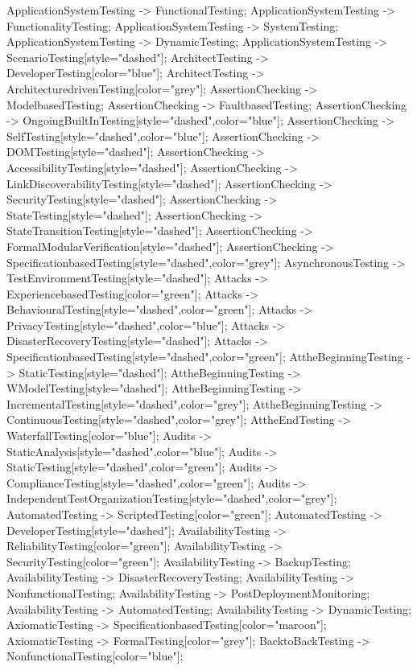 \documentclass{article}
\begin{document}
{ApplicationSystemTesting -> FunctionalTesting;
ApplicationSystemTesting -> FunctionalityTesting;
ApplicationSystemTesting -> SystemTesting;
ApplicationSystemTesting -> DynamicTesting;
ApplicationSystemTesting -> ScenarioTesting[style="dashed"];
ArchitectTesting -> DeveloperTesting[color="blue"];
ArchitectTesting -> ArchitecturedrivenTesting[color="grey"];
AssertionChecking -> ModelbasedTesting;
AssertionChecking -> FaultbasedTesting;
AssertionChecking -> OngoingBuiltInTesting[style="dashed",color="blue"];
AssertionChecking -> SelfTesting[style="dashed",color="blue"];
AssertionChecking -> DOMTesting[style="dashed"];
AssertionChecking -> AccessibilityTesting[style="dashed"];
AssertionChecking -> LinkDiscoverabilityTesting[style="dashed"];
AssertionChecking -> SecurityTesting[style="dashed"];
AssertionChecking -> StateTesting[style="dashed"];
AssertionChecking -> StateTransitionTesting[style="dashed"];
AssertionChecking -> FormalModularVerification[style="dashed"];
AssertionChecking -> SpecificationbasedTesting[style="dashed",color="grey"];
AsynchronousTesting -> TestEnvironmentTesting[style="dashed"];
Attacks -> ExperiencebasedTesting[color="green"];
Attacks -> BehaviouralTesting[style="dashed",color="green"];
Attacks -> PrivacyTesting[style="dashed",color="blue"];
Attacks -> DisasterRecoveryTesting[style="dashed"];
Attacks -> SpecificationbasedTesting[style="dashed",color="green"];
AttheBeginningTesting -> StaticTesting[style="dashed"];
AttheBeginningTesting -> WModelTesting[style="dashed"];
AttheBeginningTesting -> IncrementalTesting[style="dashed",color="grey"];
AttheBeginningTesting -> ContinuousTesting[style="dashed",color="grey"];
AttheEndTesting -> WaterfallTesting[color="blue"];
Audits -> StaticAnalysis[style="dashed",color="blue"];
Audits -> StaticTesting[style="dashed",color="green"];
Audits -> ComplianceTesting[style="dashed",color="green"];
Audits -> IndependentTestOrganizationTesting[style="dashed",color="grey"];
AutomatedTesting -> ScriptedTesting[color="green"];
AutomatedTesting -> DeveloperTesting[style="dashed"];
AvailabilityTesting -> ReliabilityTesting[color="green"];
AvailabilityTesting -> SecurityTesting[color="green"];
AvailabilityTesting -> BackupTesting;
AvailabilityTesting -> DisasterRecoveryTesting;
AvailabilityTesting -> NonfunctionalTesting;
AvailabilityTesting -> PostDeploymentMonitoring;
AvailabilityTesting -> AutomatedTesting;
AvailabilityTesting -> DynamicTesting;
AxiomaticTesting -> SpecificationbasedTesting[color="maroon"];
AxiomaticTesting -> FormalTesting[color="grey"];
BacktoBackTesting -> NonfunctionalTesting[color="blue"];
}
\end{document}
